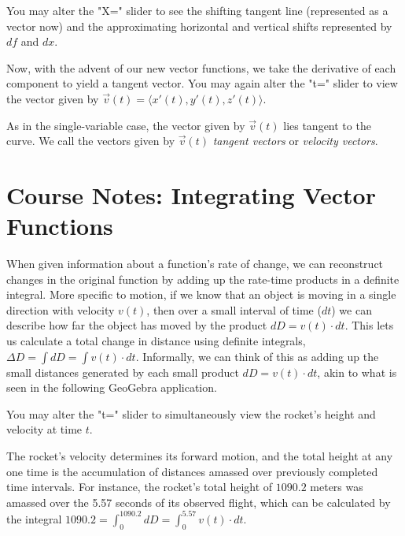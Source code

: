 \documentclass{ximera}
\begin{document}
You may alter the "X=" slider to see the shifting tangent line (represented as a vector now) and the approximating horizontal and vertical shifts represented by $df$ and $dx$.

\begin{center}
\end{center}

Now, with the advent of our new vector functions, we take the derivative of each component to yield a tangent vector. You may again alter the "t=" slider to view the vector given by $\vec{v}(t)=\langle x'(t), y'(t), z'(t)\rangle$.

\begin{center}
\end{center}

As in the single-variable case, the vector given by $\vec{v}(t)$ lies tangent to the curve. We call the vectors given by $\vec{v}(t)$ \emph{tangent vectors} or \emph{velocity vectors}.

\section{Course Notes: Integrating Vector Functions}

When given information about a function's rate of change, we can reconstruct changes in the original function by adding up the rate-time products in a definite integral. More specific to motion, if we know that an object is moving in a single direction with velocity $v(t)$, then over a small interval of time ($dt$) we can describe how far the object has moved by the product $dD=v(t)\cdot dt$. This lets us calculate a total change in distance using definite integrals, $\Delta D=\int dD=\int v(t)\cdot dt$. Informally, we can think of this as adding up the small distances generated by each small product $dD=v(t)\cdot dt$, akin to what is seen in the following GeoGebra application.

You may alter the "t=" slider to simultaneously view the rocket's height and velocity at time $t$.

\begin{center}
\end{center}

The rocket's velocity determines its forward motion, and the total height at any one time is the accumulation of distances amassed over previously completed time intervals. For instance, the rocket's total height of $1090.2$ meters was amassed over the 5.57 seconds of its observed flight, which can be calculated by the integral $1090.2=\int_0^{1090.2}dD=\int_0^{5.57}v(t)\cdot dt$.
\end{document}
